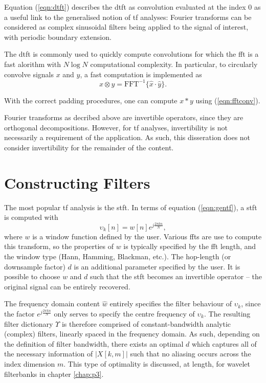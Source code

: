 Equation (\ref{eqn:dtft}) describes the \ac{dtft} as convolution evaluated at the index 0 as a useful link to the generalised notion of \ac{tf} analyses: Fourier transforms can be considered as complex sinusoidal filters being applied to the signal of interest, with periodic boundary extension.

The \ac{dtft} is commonly used to quickly compute convolutions for which the \ac{fft} is a fast alorithm with $N \log N$ computational complexity. In particular, to circularly convolve signals $x$ and $y$, a fast computation is implemented as
\begin{equation}
    \label{eqn:fftconv}
    x \otimes y = \text{FFT}^{-1}\{\hat{x} \cdot \hat{y}\}.
\end{equation}

With the correct padding procedures, one can compute $x * y$ using (\ref{eqn:fftconv}).

Fourier transforms as decribed above are invertible operators, since they are orthogonal decompositions. However, for \ac{tf} analyses, invertibility is not necessarily a requirement of the application. As such, this disseration does not consider invertibility for the remainder of the content.


\section{Constructing Filters}
\label{sec:p1i:tfa}

The most popular \ac{tf} analysis is the \ac{stft}. In terms of equation (\ref{eqn:gentf}), a \ac{stft} is computed with 
\begin{equation}
    \label{eqn:stftfilter}
    \upsilon_k[n] =  w[n] e^{j \frac{2\pi k n}{N}},
\end{equation}
where $w$ is a window function defined by the user. Various \acp{fft} are use to compute this transform, so the properties of $w$ is typically specified by the \ac{fft} length, and the window type (Hann, Hamming, Blackman, etc.). The hop-length (or downsample factor) $d$ is an additional parameter specified by the user. It is possible to choose $w$ and $d$ such that the \ac{stft} becomes an invertible operator -- the original signal can be entirely recovered.

The frequency domain content $\hat{w}$ entirely specifies the filter behaviour of $\upsilon_k$, since the factor $e^{j \frac{2\pi k n}{N}}$ only serves to specify the centre frequency of $\upsilon_k$. The resulting filter dictionary $\Upsilon$ is therefore comprised of constant-bandwidth analytic (complex) filters, linearly spaced in the frequency domain. As such, depending on the definition of filter bandwidth, there exists an optimal $d$ which captures all of the necessary information of $|X[k, m]|$ such that no aliasing occurs across the index dimension $m$. This type of optimality is discussed, at length, for wavelet filterbanks in chapter \ref{chap:p3}.

